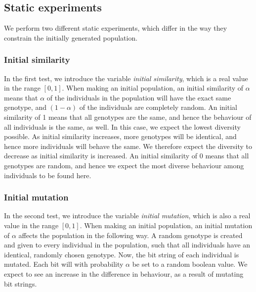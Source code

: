 \subsection{Static experiments}
We perform two different static experiments, which differ in the way they constrain the initially generated population. 

\subsubsection{Initial similarity}
In the first test, we introduce the variable \emph{initial similarity}, which is a real value in the range $[0,1]$.
When making an initial population, an initial similarity of $\alpha$ means that $\alpha$ of the individuals in the population will have the exact same genotype, and $(1 - \alpha)$ of the individuals are completely random.
An initial similarity of \num{1} means that all genotypes are the same, and hence the behaviour of all individuals is the same, as well. In this case, we expect the lowest diversity possible.
As initial similarity increases, more genotypes will be identical, and hence more individuals will behave the same.
We therefore expect the diversity to decrease as initial similarity is increased.
An initial similarity of \num{0} means that all genotypes are random, and hence we expect the most diverse behaviour among individuals to be found here.

\subsubsection{Initial mutation}
In the second test, we introduce the variable \emph{initial mutation}, which is also a real value in the range $[0,1]$.
When making an initial population, an initial mutation of $\alpha$ affects the population in the following way.
A random genotype is created and given to every individual in the population, such that all individuals have an identical, randomly chosen genotype.
Now, the bit string of each individual is mutated. Each bit will with probability $\alpha$ be set to a random boolean value. 
We expect to see an increase in the difference in behaviour, as a result of mutating bit strings. 

